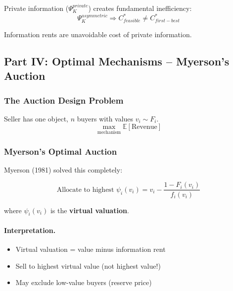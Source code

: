 Private information ($\Psi_K^{private}$) creates fundamental inefficiency:
\begin{equation}
\Psi_K^{asymmetric} \Rightarrow C^*_{feasible} \neq C^*_{first-best}
\end{equation}

Information rents are unavoidable cost of private information.

\subsection{Part IV: Optimal Mechanisms – Myerson's Auction}

\subsubsection{The Auction Design Problem}

Seller has one object, $n$ buyers with values $v_i \sim F_i$.
\begin{equation}
\max_{\text{mechanism}} \mathbb{E}[\text{Revenue}]
\end{equation}

\subsubsection{Myerson's Optimal Auction}

Myerson (1981) solved this completely:

\begin{equation}
\boxed{
\text{Allocate to highest } \psi_i(v_i) = v_i - \frac{1 - F_i(v_i)}{f_i(v_i)}
}
\label{eq:myerson-auction}
\end{equation}

where $\psi_i(v_i)$ is the \textbf{virtual valuation}.

\paragraph{Interpretation.}
\begin{itemize}
    \item Virtual valuation = value minus information rent
    \item Sell to highest virtual value (not highest value!)
    \item May exclude low-value buyers (reserve price)
\end{itemize}

